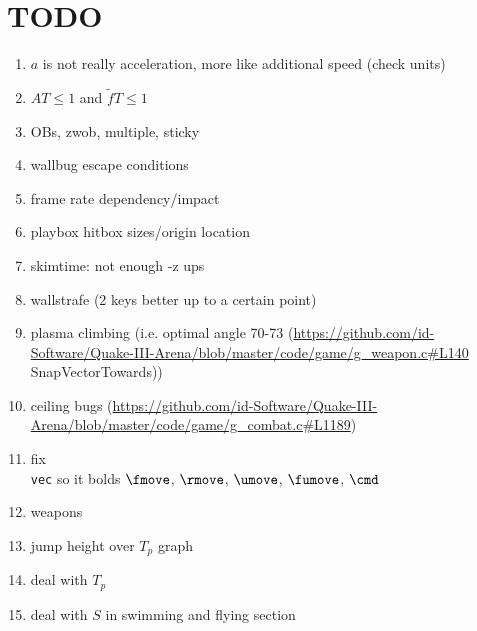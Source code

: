 \section{TODO}
\label{sec:todo}

\begin{enumerate}
  \item $a$ is not really acceleration, more like additional speed (check units)
  \item $AT \le 1$ and $\tilde{f}T \le 1$
  \item OBs, zwob, multiple, sticky
  \item wallbug escape conditions
  \item frame rate dependency/impact
  \item playbox hitbox sizes/origin location
  \item skimtime: not enough -z ups
  \item wallstrafe (2 keys better up to a certain point)
  \item plasma climbing (i.e. optimal angle 70-73 (\url{https://github.com/id-Software/Quake-III-Arena/blob/master/code/game/g_weapon.c#L140} SnapVectorTowards))
  \item ceiling bugs (\url{https://github.com/id-Software/Quake-III-Arena/blob/master/code/game/g_combat.c#L1189})
  \item fix \texttt{\\vec} so it bolds $\fmove$, $\rmove$, $\umove$, $\fumove$, $\cmd$
  \item weapons
  \item jump height over $T_p$ graph
  \item deal with $T_p$
  \item deal with $S$ in swimming and flying section
\end{enumerate}
